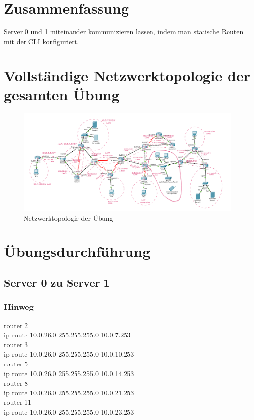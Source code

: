 \documentclass[a4paper]{article}
\begin{document}
\section{Zusammenfassung}
Server 0 und 1 miteinander kommunizieren lassen, indem man statische Routen mit der CLI konfiguriert.


\newpage

\section{Vollständige Netzwerktopologie der gesamten Übung}

\begin{figure}[h]
	\includegraphics[scale=0.6]{topologie.png}
	\caption{Netzwerktopologie der Übung}
\end{figure}

\newpage

\section{Übungsdurchführung}
\subsection{Server 0 zu Server 1}

\subsubsection{Hinweg}
router 2\\
ip route 10.0.26.0 255.255.255.0 10.0.7.253 \\
router 3\\
ip route 10.0.26.0 255.255.255.0 10.0.10.253\\
router 5\\
ip route 10.0.26.0 255.255.255.0 10.0.14.253\\
router 8\\
ip route 10.0.26.0 255.255.255.0 10.0.21.253\\
router 11\\
ip route 10.0.26.0 255.255.255.0 10.0.23.253\\
\end{document}
